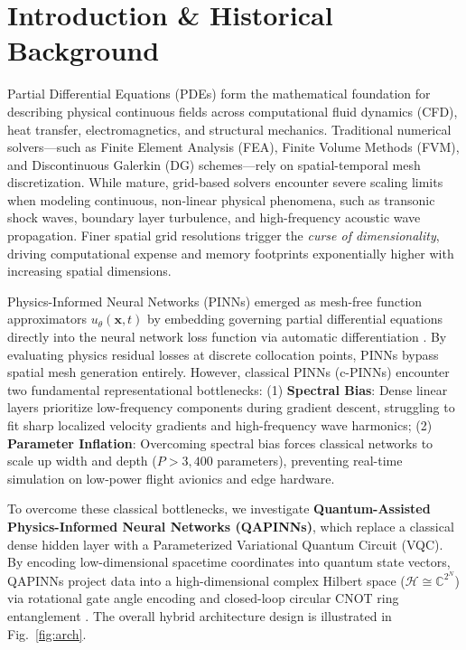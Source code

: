 \documentclass[pdflatex,sn-jnl]{sn-jnl}%
\begin{document}
\section{Introduction \& Historical Background}\label{sec1}
Partial Differential Equations (PDEs) form the mathematical foundation for describing physical continuous fields across computational fluid dynamics (CFD), heat transfer, electromagnetics, and structural mechanics. Traditional numerical solvers—such as Finite Element Analysis (FEA), Finite Volume Methods (FVM), and Discontinuous Galerkin (DG) schemes—rely on spatial-temporal mesh discretization. While mature, grid-based solvers encounter severe scaling limits when modeling continuous, non-linear physical phenomena, such as transonic shock waves, boundary layer turbulence, and high-frequency acoustic wave propagation. Finer spatial grid resolutions trigger the \emph{curse of dimensionality}, driving computational expense and memory footprints exponentially higher with increasing spatial dimensions.

Physics-Informed Neural Networks (PINNs) emerged as mesh-free function approximators $u_\theta(\mathbf{x},t)$ by embedding governing partial differential equations directly into the neural network loss function via automatic differentiation \cite{raissi2019}. By evaluating physics residual losses at discrete collocation points, PINNs bypass spatial mesh generation entirely. However, classical PINNs (c-PINNs) encounter two fundamental representational bottlenecks: (1) \textbf{Spectral Bias}: Dense linear layers prioritize low-frequency components during gradient descent, struggling to fit sharp localized velocity gradients and high-frequency wave harmonics; (2) \textbf{Parameter Inflation}: Overcoming spectral bias forces classical networks to scale up width and depth ($P > 3,400$ parameters), preventing real-time simulation on low-power flight avionics and edge hardware.

To overcome these classical bottlenecks, we investigate \textbf{Quantum-Assisted Physics-Informed Neural Networks (QAPINNs)}, which replace a classical dense hidden layer with a Parameterized Variational Quantum Circuit (VQC). By encoding low-dimensional spacetime coordinates into quantum state vectors, QAPINNs project data into a high-dimensional complex Hilbert space ($\mathcal{H} \cong \mathbb{C}^{2^N}$) via rotational gate angle encoding and closed-loop circular CNOT ring entanglement \cite{shah2024,maria2021}. The overall hybrid architecture design is illustrated in Fig.~\ref{fig:arch}.
\end{document}
